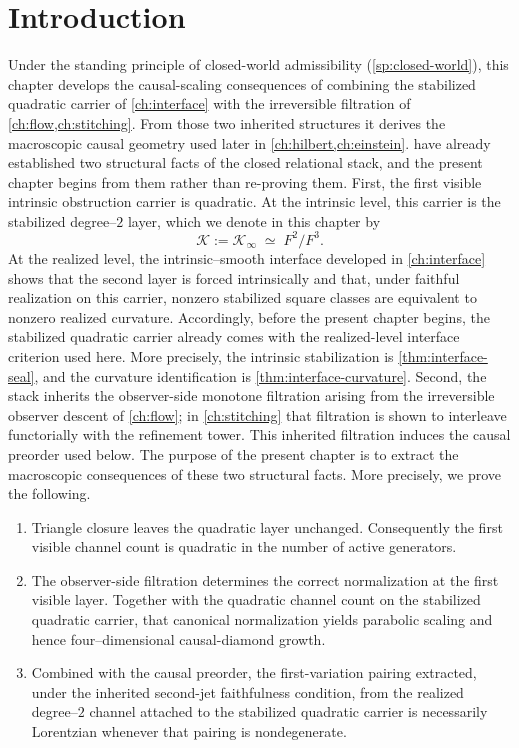 \section{Introduction}
Under the standing principle of closed-world admissibility
(\cref{sp:closed-world}), this chapter develops the causal-scaling
consequences of combining the stabilized quadratic carrier of
\cref{ch:interface} with the irreversible filtration of
\cref{ch:flow,ch:stitching}.  From those two inherited structures it
derives the macroscopic causal geometry used later in
\cref{ch:hilbert,ch:einstein}.
 have already established two
structural facts of
the closed relational stack, and the present chapter begins from them
rather than re-proving them.
First, the first visible intrinsic obstruction carrier is quadratic.
At the intrinsic level, this carrier is the stabilized degree--\(2\)
layer, which we denote in this chapter by
\[
	\mathcal K:=\mathcal K_\infty \;\simeq\; F^2/F^3.
\]
At the realized level, the intrinsic--smooth interface developed in
\cref{ch:interface} shows that the second layer is forced intrinsically
and that, under faithful realization on this carrier, nonzero stabilized
square classes are equivalent to nonzero realized curvature.
Accordingly, before the present chapter begins, the stabilized quadratic
carrier already comes with the realized-level interface criterion used
here.  More precisely, the intrinsic stabilization is
\cref{thm:interface-seal}, and the curvature identification is
\cref{thm:interface-curvature}.
Second, the stack inherits the observer-side monotone filtration
arising from the irreversible observer descent of \cref{ch:flow}; in
\cref{ch:stitching} that filtration is shown to interleave
functorially with the refinement tower.  This inherited filtration
induces the causal preorder used below.
The purpose of the present chapter is to extract the macroscopic
consequences of these two structural facts.  More precisely, we prove
the following.
\begin{enumerate}[label=\textup{(\roman*)}]
	\item
	      Triangle closure leaves the quadratic layer unchanged.  Consequently the
	      first visible channel count is quadratic in the number of active
	      generators.
	\item
	      The observer-side filtration determines the correct
	      normalization at the first visible layer.  Together with the
	      quadratic channel count on the stabilized quadratic carrier,
	      that canonical normalization yields parabolic scaling and hence
	      four--dimensional causal-diamond growth.
	\item
	      Combined with the causal preorder, the first-variation pairing
	      extracted, under the inherited second-jet faithfulness condition,
	      from the realized degree--\(2\) channel attached to the
	      stabilized quadratic carrier is necessarily Lorentzian whenever
	      that pairing is nondegenerate.
\end{enumerate}
